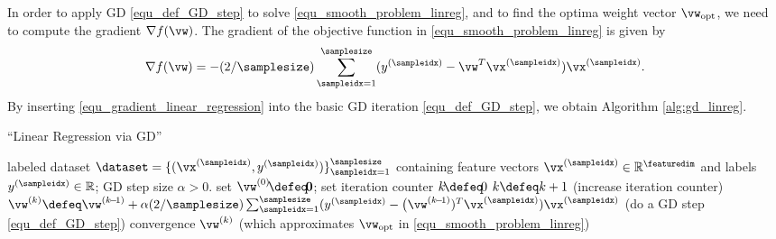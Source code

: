 \documentclass[12pt]{report}
\begin{document}
In order to apply GD \eqref{equ_def_GD_step} to solve \eqref{equ_smooth_problem_linreg}, and to find the optima weight vector $\vw_{\rm opt}$, 
we need to compute the gradient $\nabla f(\vw)$. The gradient of the objective function in \eqref{equ_smooth_problem_linreg} is given by 
\begin{equation}
\label{equ_gradient_linear_regression}
\nabla f(\vw) = -(2/\samplesize) \sum_{\sampleidx=1}^{\samplesize} (y^{(\sampleidx)} - \vw^{T} \vx^{(\sampleidx)}) \vx^{(\sampleidx)}.
\end{equation} 
By inserting \eqref{equ_gradient_linear_regression} into the basic GD iteration \eqref{equ_def_GD_step}, we obtain Algorithm \ref{alg:gd_linreg}. 
\begin{algorithm}[htbp]
\caption{``Linear Regression via GD''}\label{alg:gd_linreg}
\begin{algorithmic}[1]
\renewcommand{\algorithmicrequire}{\textbf{Input:}}
\renewcommand{\algorithmicensure}{\textbf{Output:}}
\Require   labeled dataset $\dataset=\{ (\vx^{(\sampleidx)}, y^{(\sampleidx)}) \}_{\sampleidx=1}^{\samplesize}$ containing feature vectors 
$\vx^{(\sampleidx)} \in \mathbb{R}^{\featuredim}$ and labels $y^{(\sampleidx)} \in \mathbb{R}$; GD step size $\alpha >0$. 
\Statex\hspace{-6mm}{\bf Initialize:} set $\vw^{(0)}\!\defeq\!\mathbf{0}$; set iteration counter $k\!\defeq\!0$   
\Repeat 
\State $k \defeq k +1$    (increase iteration counter) 
\State  $\vw^{(k)} \defeq \vw^{(k\!-\!1)} + \alpha (2/\samplesize) \sum_{\sampleidx=1}^{\samplesize} (y^{(\sampleidx)} - \big(\vw^{(k\!-\!1)})^{T} \vx^{(\sampleidx)}) \vx^{(\sampleidx)}$  (do a GD step \eqref{equ_def_GD_step})
\Until convergence 
\Ensure $\vw^{(k)}$ (which approximates $\vw_{\rm opt}$ in \eqref{equ_smooth_problem_linreg})
\end{algorithmic}
\end{algorithm}
\end{document}
